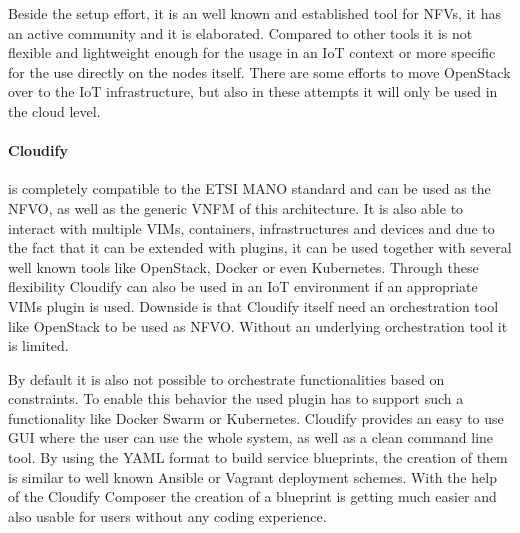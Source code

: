Beside the setup effort, it is an well known and established tool for \acp{NFV}, it has an active community and it is elaborated.
Compared to other tools it is not flexible and lightweight enough for the usage in an \ac{IoT} context or more specific for the use directly on the nodes itself.
There are some efforts to move OpenStack over to the \ac{IoT} infrastructure\autocite{OpenStack:IoT}\autocite{OpenStack:Kubernetes:IoT}, but also in these attempts it will only be used in the cloud level.

\paragraph{Cloudify} is completely compatible to the \ac{ETSI} \ac{MANO} standard and can be used as the \ac{NFVO}, as well as the generic \ac{VNFM} of this architecture.\autocite[cf.]{Cloudify:MANO}
It is also able to interact with multiple \acp{VIM}, containers, infrastructures and devices and due to the fact that it can be extended with plugins, it can be used together with several well known tools like OpenStack, Docker or even Kubernetes.\autocite[cf.]{Cloudify:MANO}
Through these flexibility Cloudify can also be used in an \ac{IoT} environment if an appropriate \acp{VIM} plugin is used.
Downside is that Cloudify itself need an orchestration tool like OpenStack to be used as \ac{NFVO}.
Without an underlying orchestration tool it is limited.

By default it is also not possible to orchestrate functionalities based on constraints.
To enable this behavior the used plugin has to support such a functionality like Docker Swarm or Kubernetes.
Cloudify provides an easy to use \ac{GUI} where the user can use the whole system, as well as a clean command line tool.
By using the \ac{YAML} format to build service blueprints, the creation of them is similar to well known Ansible or Vagrant deployment schemes.
With the help of the Cloudify Composer the creation of a blueprint is getting much easier and also usable for users without any coding experience.

